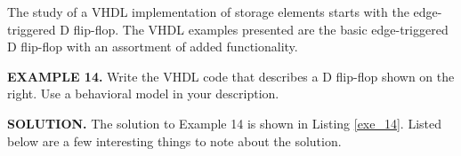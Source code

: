 The study of a VHDL implementation of storage elements starts with the edge-triggered D flip-flop. The VHDL examples presented are the basic edge-triggered D flip-flop with an assortment of added functionality. 
\begin{leftbar}
\begin{minipage}{0.5\linewidth}
\noindent
\textbf{EXAMPLE 14.}
Write the VHDL code that describes a D flip-flop shown on the right. Use a behavioral model in your description.
\end{minipage}
\begin{minipage}{0.47\linewidth}
\begin{flushright}
\end{flushright}
\end{minipage}
\end{leftbar}
\noindent
\textbf{SOLUTION.} The solution to Example 14 is shown in Listing \ref{exe_14}. Listed below are a few interesting things to note about the solution.
